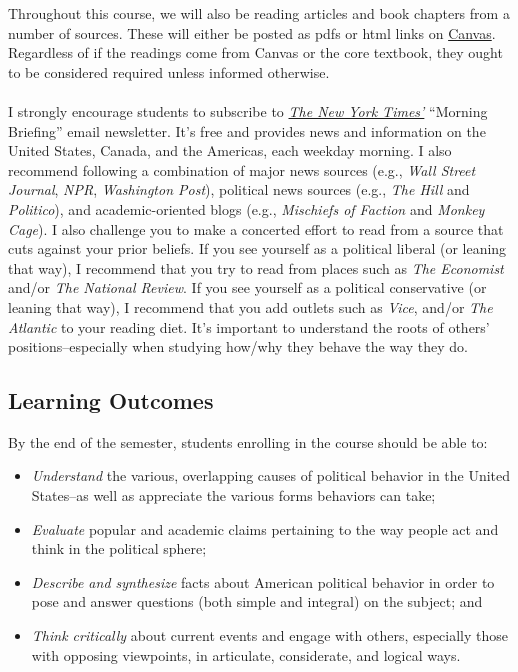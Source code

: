 \documentclass[11pt]{article}
\def\doubleq#1{``#1''}
\begin{document}
Throughout this course, we will also be reading articles and book chapters from a number of sources. These will either be posted as pdfs or html links on {\href{http://ufl.instructure.com/}{Canvas}}. Regardless of if the readings come from Canvas or the core textbook, they ought to be considered required unless informed otherwise. 
\\\\
I strongly encourage students to subscribe to \textit{{\href{https://www.nytimes.com/newsletters}{The New York Times'}}} \doubleq{Morning Briefing} email newsletter. It's free and provides news and information on the United States, Canada, and the Americas, each weekday morning. I also recommend following a combination of major news sources (e.g., \textit{Wall Street Journal}, \textit{NPR}, \textit{Washington Post}), political news sources (e.g., \textit{The Hill} and \textit{Politico}), and academic-oriented blogs (e.g., \textit{Mischiefs of Faction} and \textit{Monkey Cage}). I also challenge you to make a concerted effort to read from a source that cuts against your prior beliefs. If you see yourself as a political liberal (or leaning that way), I recommend that you try to read from places such as \textit{The Economist} and/or \textit{The National Review}. If you see yourself as a political conservative (or leaning that way), I recommend that you add outlets such as \textit{Vice}, and/or \textit{The Atlantic} to your reading diet. It's important to understand the roots of others' positions--especially when studying how/why they behave the way they do.

\subsection{Learning Outcomes} 
By the end of the semester, students enrolling in the course should be able to:
\begin{itemize}
\item \textit{Understand} the various, overlapping causes of political behavior in the United States--as well as appreciate the various forms behaviors can take;
\item \textit{Evaluate} popular and academic claims pertaining to the way people act and think in the political sphere;
\item \textit{Describe and synthesize} facts about American political behavior in order to pose and answer questions (both simple and integral) on the subject; and
\item \textit{Think critically} about current events and engage with others, especially those with opposing viewpoints, in articulate, considerate, and logical ways.
\end{itemize}
\end{document}
